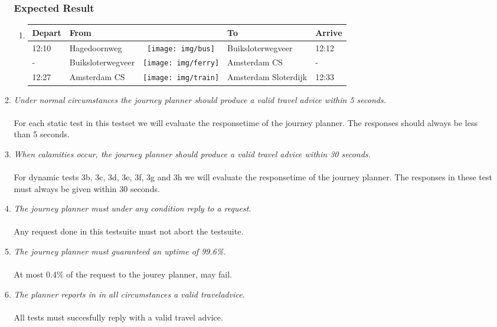 \documentclass[a4paper,11pt]{article}
\newcommand*{\bus}{\texttt{[image: img/bus]}}
\newcommand*{\ferry}{\texttt{[image: img/ferry]}}
\newcommand*{\train}{\texttt{[image: img/train]}}
\begin{document}
\begin{enumerate}
\begin{enumerate}
\subsubsection*{Expected Result}
\begin{enumerate}
\item 
{\scriptsize
\begin{tabular}{p{.75cm} | p{3.0cm} c p{3.0cm} | p{.75cm} }
\hline
\rowcolor{Gray}
Depart & From & & To & Arrive \\
\hline
12:10 & Hagedoornweg & \bus & Buiksloterwegveer & 12:12 \\
\hline
  - & Buiksloterwegveer & \ferry & Amsterdam CS & - \\
\hline
12:27 & Amsterdam CS & \train & Amsterdam Sloterdijk & 12:33 \\
\hline
\end{tabular}
}
\end{enumerate}
\newpage
\item \textit{Under normal circumstances the journey planner should produce a valid travel advice within 5 seconds.}\\
\\
For each static test in this testset we will evaluate the responsetime of the journey planner.
The responses should always be less than 5 seconds.
\\
\item \textit{When calamities occur, the journey planner should produce a valid travel advice within 30 seconds.}\\
\\
For dynamic tests 3b, 3c, 3d, 3e, 3f, 3g and 3h we will evaluate the responsetime of the journey planner.
The responses in these test must always be given within 30 seconds.
\\

\item \textit{The journey planner must under any condition reply to a request.}\\
\\
Any request done in this testsuite must not abort the testsuite.
\\

\item \textit{The journey planner must guaranteed an uptime of 99.6\%.}\\
\\
At most 0.4\% of the request to the jourey planner, may fail.
\\

\item \textit{The planner reports in in all circumstances a valid traveladvice.}\\
\\
All tests must succesfully reply with a valid travel advice.
\\


\end{enumerate}
\end{enumerate}
\end{document}
